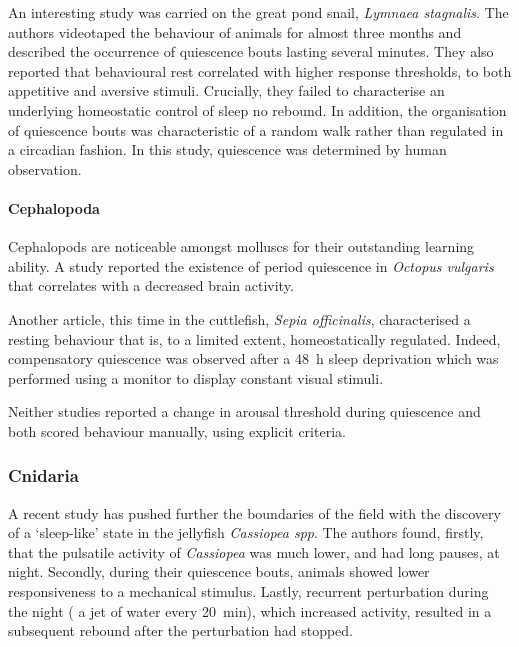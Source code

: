An interesting study was carried on the great pond snail, \emph{Lymnaea stagnalis}\cite{stephenson_behavioural_2011}. The authors videotaped the behaviour of animals for almost three months and described the occurrence of quiescence bouts lasting several minutes.
They also reported that behavioural rest correlated with higher response thresholds, to both appetitive and aversive stimuli.
Crucially, they failed to characterise an underlying homeostatic control of sleep\emd{}\ie{} no rebound. 
In addition, the organisation of quiescence 
bouts was characteristic of a random walk rather than regulated in a circadian fashion.
In this study, quiescence was determined by human observation.

\paragraph*{Cephalopoda}


Cephalopods are noticeable amongst molluscs for their outstanding learning ability. 
A study reported the existence of period quiescence in \emph{Octopus vulgaris} that correlates with a decreased brain activity\cite{brown_brain_2006}.

Another article, this time in the cuttlefish, \emph{Sepia officinalis}, characterised a resting behaviour that is, to a limited extent, homeostatically regulated.
Indeed, compensatory quiescence was observed after a 48~h sleep deprivation\emd{} which was performed using a monitor to display constant visual stimuli\cite{frank_preliminary_2012}.

Neither studies reported a change in arousal threshold during quiescence and both scored behaviour manually, using explicit criteria.

\subsubsection{Cnidaria}

A recent study has pushed further the boundaries of the field with the discovery of a `sleep-like' state in the jellyfish \emph{Cassiopea spp}\cite{nath_jellyfish_2017}.
The authors found, firstly, that the pulsatile activity of \emph{Cassiopea} was much lower, and had long pauses, at night.
Secondly, during their quiescence bouts, animals showed lower responsiveness to a mechanical stimulus.
Lastly, recurrent perturbation during the night (\ie{} a jet of water every 20~min), which increased activity, resulted in a subsequent rebound after the perturbation had stopped.


